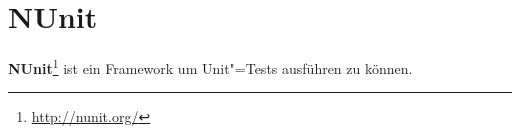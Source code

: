 \section{NUnit}
\label{sec:nunit}

\textbf{NUnit}\footnote{\url{http://nunit.org/}} ist ein Framework um Unit"=Tests ausführen zu können.

